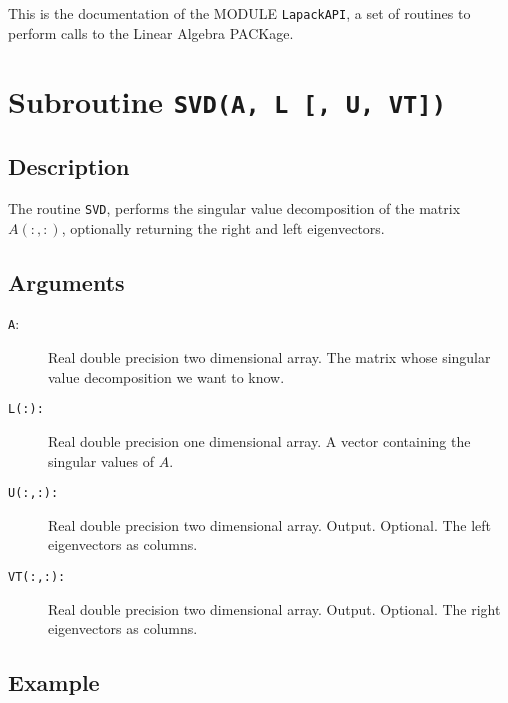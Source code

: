 
This is the documentation of the MODULE \texttt{LapackAPI}, a set
of routines to perform calls to the Linear Algebra PACKage. 



\section{Subroutine \texttt{SVD(A, L [, U, VT])}}

\subsection{Description}

The routine \texttt{SVD}, performs the singular value decomposition of
the matrix $A(:,:)$, optionally returning the right and left
eigenvectors. 

\subsection{Arguments}

\begin{description}
\item[\texttt{A}:]  Real double precision two dimensional array. The
  matrix whose singular value decomposition we want to know.

\item[\texttt{L(:): }] Real double precision one dimensional array. A
  vector containing the singular values of $A$.

\item[\texttt{U(:,:):}] Real double precision two dimensional
  array. Output. Optional. The left eigenvectors as columns.

\item[\texttt{VT(:,:):}] Real double precision two dimensional
  array. Output. Optional. The right eigenvectors as columns.
\end{description}

\subsection{Example}

